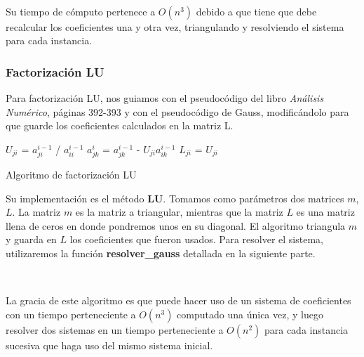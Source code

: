 \

Su tiempo de cómputo pertenece a $O(n^3)$ debido a que tiene que debe recalcular los coeficientes una y otra vez, triangulando y resolviendo el sistema para cada instancia.

\newpage

\subsubsection{Factorización LU}

Para factorización LU, nos guiamos con el pseudocódigo del libro \emph{Análisis Numérico}, páginas 392-393 y con el pseudocódigo de Gauss, modificándolo para que guarde los coeficientes calculados en la matriz L. 

\begin{algorithm}[H]
\begin{algorithmic}[1]
        \State $U_{ji}$ = $a_{ji}^{i-1}$ / $a_{ii}^{i-1}$
            \State $a_{jk}^{i}$ = $a_{jk}^{i-1}$ - $U_{ji} a_{ik}^{i-1}$
        \EndFor
        \State $L_{ji}$ = $U_{ji}$
    \EndFor
\EndFor
\EndFunction
\end{algorithmic}
\caption{Algoritmo de factorización LU}
\label{alg:lu}
\end{algorithm}

Su implementación es el método \textbf{LU}. Tomamos como parámetros dos matrices $m$, $L$. La matriz $m$ es la matriz a triangular, mientras que la matriz $L$ es una matriz llena de ceros en donde pondremos unos en su diagonal. El algoritmo triangula $m$ y guarda en $L$ los coeficientes que fueron usados. Para resolver el sistema, utilizaremos la función \textbf{resolver\_gauss} detallada en la siguiente parte. 

\

La gracia de este algoritmo es que puede hacer uso de un sistema de coeficientes con un tiempo perteneciente a $O(n^3)$ computado una única vez, y luego resolver dos sistemas en un tiempo perteneciente a $O(n^2)$ para cada instancia sucesiva que haga uso del mismo sistema inicial.

